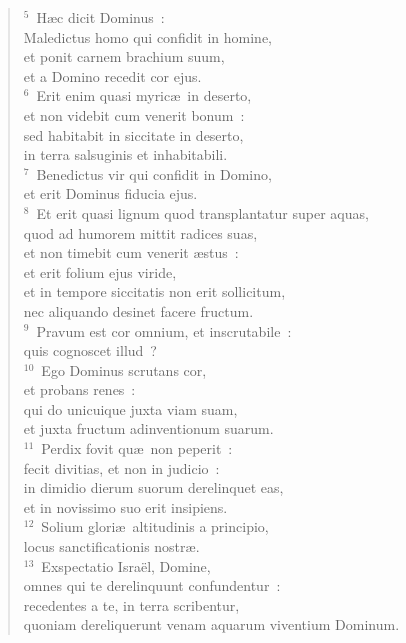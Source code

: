 \begin{verse}${}^{5}$~H\ae c dicit Dominus~:\\ Maledictus homo qui confidit in homine,\\ et ponit carnem brachium suum,\\ et a Domino recedit cor ejus.\\
${}^{6}$~Erit enim quasi myric\ae\ in deserto,\\ et non videbit cum venerit bonum~:\\ sed habitabit in siccitate in deserto,\\ in terra salsuginis et inhabitabili.\\
${}^{7}$~Benedictus vir qui confidit in Domino,\\ et erit Dominus fiducia ejus.\\
${}^{8}$~Et erit quasi lignum quod transplantatur super aquas,\\ quod ad humorem mittit radices suas,\\ et non timebit cum venerit \ae stus~:\\ et erit folium ejus viride,\\ et in tempore siccitatis non erit sollicitum,\\ nec aliquando desinet facere fructum.\\
${}^{9}$~Pravum est cor omnium, et inscrutabile~:\\ quis cognoscet illud~?\\
${}^{10}$~Ego Dominus scrutans cor,\\ et probans renes~:\\ qui do unicuique juxta viam suam,\\ et juxta fructum adinventionum suarum.\\
${}^{11}$~Perdix fovit qu\ae\ non peperit~:\\ fecit divitias, et non in judicio~:\\ in dimidio dierum suorum derelinquet eas,\\ et in novissimo suo erit insipiens.\\
${}^{12}$~Solium glori\ae\ altitudinis a principio,\\ locus sanctificationis nostr\ae .\\
${}^{13}$~Exspectatio Isra\"el, Domine,\\ omnes qui te derelinquunt confundentur~:\\ recedentes a te, in terra scribentur,\\ quoniam dereliquerunt venam aquarum viventium Dominum.\\

\end{verse}
